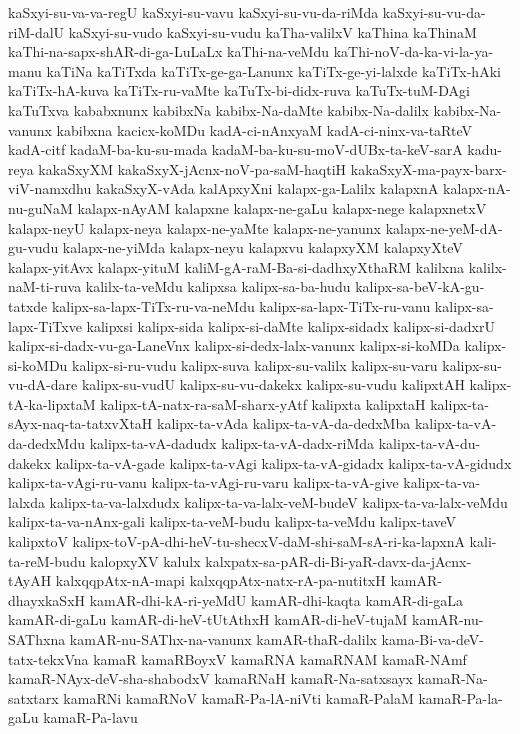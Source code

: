 {kaSxyi-su-va-va-regU
kaSxyi-su-vavu
kaSxyi-su-vu-da-riMda
kaSxyi-su-vu-da-riM-dalU
kaSxyi-su-vudo
kaSxyi-su-vudu
kaTha-valilxV
kaThina
kaThinaM
kaThi-na-sapx-shAR-di-ga-LuLaLx
kaThi-na-veMdu
kaThi-noV-da-ka-vi-la-ya-manu
kaTiNa
kaTiTxda
kaTiTx-ge-ga-Lanunx
kaTiTx-ge-yi-lalxde
kaTiTx-hAki
kaTiTx-hA-kuva
kaTiTx-ru-vaMte
kaTuTx-bi-didx-ruva
kaTuTx-tuM-DAgi
kaTuTxva
kababxnunx
kabibxNa
kabibx-Na-daMte
kabibx-Na-dalilx
kabibx-Na-vanunx
kabibxna
kacicx-koMDu
kadA-ci-nAnxyaM
kadA-ci-ninx-va-taRteV
kadA-citf
kadaM-ba-ku-su-mada
kadaM-ba-ku-su-moV-dUBx-ta-keV-sarA
kadu-reya
kakaSxyXM
kakaSxyX-jAcnx-noV-pa-saM-haqtiH
kakaSxyX-ma-payx-barx-viV-namxdhu
kakaSxyX-vAda
kalApxyXni
kalapx-ga-Lalilx
kalapxnA
kalapx-nA-nu-guNaM
kalapx-nAyAM
kalapxne
kalapx-ne-gaLu
kalapx-nege
kalapxnetxV
kalapx-neyU
kalapx-neya
kalapx-ne-yaMte
kalapx-ne-yanunx
kalapx-ne-yeM-dA-gu-vudu
kalapx-ne-yiMda
kalapx-neyu
kalapxvu
kalapxyXM
kalapxyXteV
kalapx-yitAvx
kalapx-yituM
kaliM-gA-raM-Ba-si-dadhxyXthaRM
kalilxna
kalilx-naM-ti-ruva
kalilx-ta-veMdu
kalipxsa
kalipx-sa-ba-hudu
kalipx-sa-beV-kA-gu-tatxde
kalipx-sa-lapx-TiTx-ru-va-neMdu
kalipx-sa-lapx-TiTx-ru-vanu
kalipx-sa-lapx-TiTxve
kalipxsi
kalipx-sida
kalipx-si-daMte
kalipx-sidadx
kalipx-si-dadxrU
kalipx-si-dadx-vu-ga-LaneVnx
kalipx-si-dedx-lalx-vanunx
kalipx-si-koMDa
kalipx-si-koMDu
kalipx-si-ru-vudu
kalipx-suva
kalipx-su-valilx
kalipx-su-varu
kalipx-su-vu-dA-dare
kalipx-su-vudU
kalipx-su-vu-dakekx
kalipx-su-vudu
kalipxtAH
kalipx-tA-ka-lipxtaM
kalipx-tA-natx-ra-saM-sharx-yAtf
kalipxta
kalipxtaH
kalipx-ta-sAyx-naq-ta-tatxvXtaH
kalipx-ta-vAda
kalipx-ta-vA-da-dedxMba
kalipx-ta-vA-da-dedxMdu
kalipx-ta-vA-dadudx
kalipx-ta-vA-dadx-riMda
kalipx-ta-vA-du-dakekx
kalipx-ta-vA-gade
kalipx-ta-vAgi
kalipx-ta-vA-gidadx
kalipx-ta-vA-gidudx
kalipx-ta-vAgi-ru-vanu
kalipx-ta-vAgi-ru-varu
kalipx-ta-vA-give
kalipx-ta-va-lalxda
kalipx-ta-va-lalxdudx
kalipx-ta-va-lalx-veM-budeV
kalipx-ta-va-lalx-veMdu
kalipx-ta-va-nAnx-gali
kalipx-ta-veM-budu
kalipx-ta-veMdu
kalipx-taveV
kalipxtoV
kalipx-toV-pA-dhi-heV-tu-shecxV-daM-shi-saM-sA-ri-ka-lapxnA
kali-ta-reM-budu
kalopxyXV
kalulx
kalxpatx-sa-pAR-di-Bi-yaR-davx-da-jAcnx-tAyAH
kalxqqpAtx-nA-mapi
kalxqqpAtx-natx-rA-pa-nutitxH
kamAR-dhayxkaSxH
kamAR-dhi-kA-ri-yeMdU
kamAR-dhi-kaqta
kamAR-di-gaLa
kamAR-di-gaLu
kamAR-di-heV-tUtAthxH
kamAR-di-heV-tujaM
kamAR-nu-SAThxna
kamAR-nu-SAThx-na-vanunx
kamAR-thaR-dalilx
kama-Bi-va-deV-tatx-tekxVna
kamaR
kamaRBoyxV
kamaRNA
kamaRNAM
kamaR-NAmf
kamaR-NAyx-deV-sha-shabodxV
kamaRNaH
kamaR-Na-satxsayx
kamaR-Na-satxtarx
kamaRNi
kamaRNoV
kamaR-Pa-lA-niVti
kamaR-PalaM
kamaR-Pa-la-gaLu
kamaR-Pa-lavu
}
